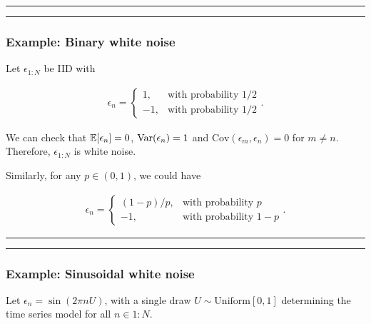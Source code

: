 \documentclass[]{article}
\newcommand{\cov}{\text{Cov}}
\begin{document}
\begin{center}\rule{0.5\linewidth}{\linethickness}\end{center}

\begin{center}\rule{0.5\linewidth}{\linethickness}\end{center}

\subsubsection{Example: Binary white
noise}\label{example-binary-white-noise}

Let \(\epsilon_{1:N}\) be IID with

\begin{eqnarray}
\epsilon_n = \left\{\begin{array}{ll}
  1, & \mbox{with probability $1/2$} \\
  -1, & \mbox{with probability $1/2$} \end{array}\right. .
\end{eqnarray}

We can check that \(\mathbb{E}[\epsilon_n]=0\), \(\mathrm{Var}(\epsilon_n)=1\) and
\(\cov(\epsilon_m,\epsilon_n)=0\) for \(m\neq n\). Therefore,
\(\epsilon_{1:N}\) is white noise.

Similarly, for any \(p\in (0,1)\), we could have

\begin{eqnarray}
\epsilon_n = \left\{\begin{array}{ll}
  (1-p)/p, & \mbox{with probability $p$} \\
  -1, & \mbox{with probability $1-p$} \end{array}\right. .
\end{eqnarray}

\begin{center}\rule{0.5\linewidth}{\linethickness}\end{center}

\begin{center}\rule{0.5\linewidth}{\linethickness}\end{center}

\subsubsection{Example: Sinusoidal white
noise}\label{example-sinusoidal-white-noise}

Let \(\epsilon_n = \sin(2\pi n U)\), with a single draw
\(U\sim\mathrm{Uniform}[0,1]\) determining the time series model for all
\(n\in 1:N\).
\end{document}
